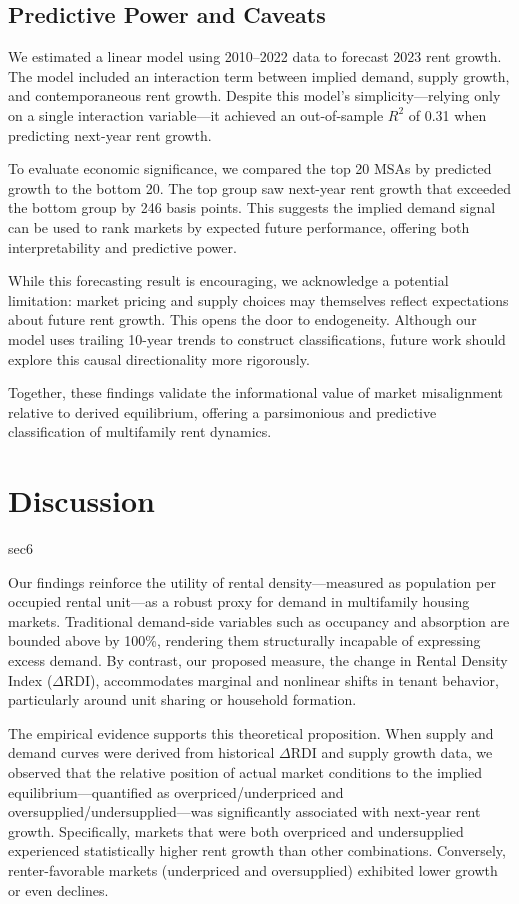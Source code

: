 \documentclass[APA,Times1COL]{WileyNJDv5} %
\begin{document}
\subsection{Predictive Power and Caveats}

We estimated a linear model using 2010--2022 data to forecast 2023 rent growth. The model included an interaction term between implied demand, supply growth, and contemporaneous rent growth. Despite this model’s simplicity—relying only on a single interaction variable—it achieved an out-of-sample $R^2$ of 0.31 when predicting next-year rent growth.

To evaluate economic significance, we compared the top 20 MSAs by predicted growth to the bottom 20. The top group saw next-year rent growth that exceeded the bottom group by 246 basis points. This suggests the implied demand signal can be used to rank markets by expected future performance, offering both interpretability and predictive power.

While this forecasting result is encouraging, we acknowledge a potential limitation: market pricing and supply choices may themselves reflect expectations about future rent growth. This opens the door to endogeneity. Although our model uses trailing 10-year trends to construct classifications, future work should explore this causal directionality more rigorously.

Together, these findings validate the informational value of market misalignment relative to derived equilibrium, offering a parsimonious and predictive classification of multifamily rent dynamics.


\section{Discussion}{sec6}

Our findings reinforce the utility of rental density---measured as population per occupied rental unit---as a robust proxy for demand in multifamily housing markets. Traditional demand-side variables such as occupancy and absorption are bounded above by 100\%, rendering them structurally incapable of expressing excess demand. By contrast, our proposed measure, the change in Rental Density Index (\(\Delta\text{RDI}\)), accommodates marginal and nonlinear shifts in tenant behavior, particularly around unit sharing or household formation.

The empirical evidence supports this theoretical proposition. When supply and demand curves were derived from historical \(\Delta\text{RDI}\) and supply growth data, we observed that the relative position of actual market conditions to the implied equilibrium---quantified as overpriced/underpriced and oversupplied/undersupplied---was significantly associated with next-year rent growth. Specifically, markets that were both overpriced and undersupplied experienced statistically higher rent growth than other combinations. Conversely, renter-favorable markets (underpriced and oversupplied) exhibited lower growth or even declines. 
\end{document}
